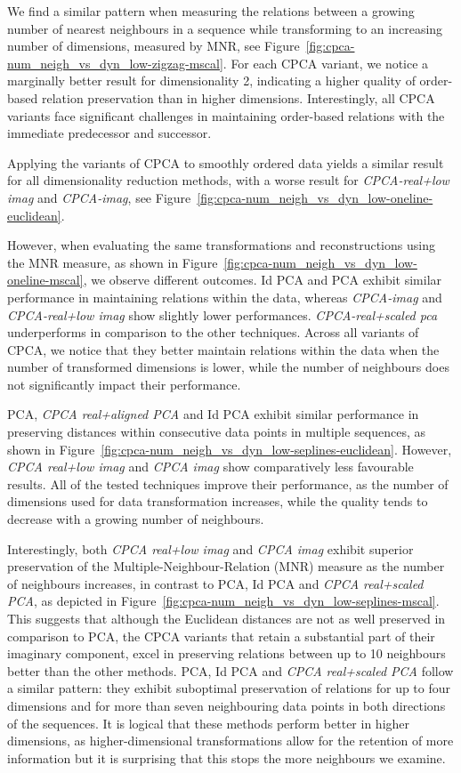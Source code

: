 \documentclass[pdftex,12pt,a4paper]{report}
\begin{document}
We find a similar pattern when measuring the relations between a growing number of nearest neighbours in a sequence while transforming to an increasing number of dimensions, measured by MNR, see Figure~\ref{fig:cpca-num_neigh_vs_dyn_low-zigzag-mscal}.
For each CPCA variant, we notice a marginally better result for dimensionality 2, indicating a higher quality of order-based relation preservation than in higher dimensions.
Interestingly, all CPCA variants face significant challenges in maintaining order-based relations with the immediate predecessor and successor.

Applying the variants of CPCA to smoothly ordered data yields a similar result for all dimensionality reduction methods, with a worse result for \textit{CPCA-real+low imag} and \textit{CPCA-imag}, see Figure~\ref{fig:cpca-num_neigh_vs_dyn_low-oneline-euclidean}.

However, when evaluating the same transformations and reconstructions using the MNR measure, as shown in Figure~\ref{fig:cpca-num_neigh_vs_dyn_low-oneline-mscal}, we observe different outcomes.
Id PCA and PCA exhibit similar performance in maintaining relations within the data, whereas \textit{CPCA-imag} and \textit{CPCA-real+low imag} show slightly lower performances.
\textit{CPCA-real+scaled pca} underperforms in comparison to the other techniques.
Across all variants of CPCA, we notice that they better maintain relations within the data when the number of transformed dimensions is lower, while the number of neighbours does not significantly impact their performance.

PCA, \textit{CPCA real+aligned PCA} and Id PCA exhibit similar performance in preserving distances within consecutive data points in multiple sequences, as shown in Figure~\ref{fig:cpca-num_neigh_vs_dyn_low-seplines-euclidean}.
However, \textit{CPCA real+low imag} and \textit{CPCA imag} show comparatively less favourable results.
All of the tested techniques improve their performance, as the number of dimensions used for data transformation increases, while the quality tends to decrease with a growing number of neighbours.


Interestingly, both \textit{CPCA real+low imag} and \textit{CPCA imag} exhibit superior preservation of the Multiple-Neighbour-Relation (MNR) measure as the number of neighbours increases, in contrast to PCA, Id PCA and \textit{CPCA real+scaled PCA}, as depicted in Figure~\ref{fig:cpca-num_neigh_vs_dyn_low-seplines-mscal}.
This suggests that although the Euclidean distances are not as well preserved in comparison to PCA, the CPCA variants that retain a substantial part of their imaginary component, excel in preserving relations between up to 10 neighbours better than the other methods.
PCA, Id PCA and \textit{CPCA real+scaled PCA} follow a similar pattern: they exhibit suboptimal preservation of relations for up to four dimensions and for more than seven neighbouring data points in both directions of the sequences.
It is logical that these methods perform better in higher dimensions, as higher-dimensional transformations allow for the retention of more information but it is surprising that this stops the more neighbours we examine.
\end{document}

